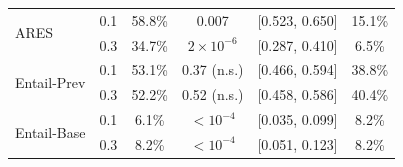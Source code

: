 \begin{table}[t]
{\begin{tabular}{llcccc}
\multirow{2}{*}{ARES}
    & 0.1 & 58.8\% & 0.007            & [0.523, 0.650] & 15.1\% \\
    & 0.3 & 34.7\% & $2\times10^{-6}$ & [0.287, 0.410] & 6.5\% \\
\midrule
\multirow{2}{*}{Entail-Prev}
    & 0.1 & 53.1\% & 0.37 (n.s.) & [0.466, 0.594] & 38.8\% \\
    & 0.3 & 52.2\% & 0.52 (n.s.) & [0.458, 0.586] & 40.4\% \\
\midrule
\multirow{2}{*}{Entail-Base}
    & 0.1 & 6.1\% & $<10^{-4}$ & [0.035, 0.099] & 8.2\% \\
    & 0.3 & 8.2\% & $<10^{-4}$ & [0.051, 0.123] & 8.2\% \\

\bottomrule
\end{tabular}
}
\end{table}
